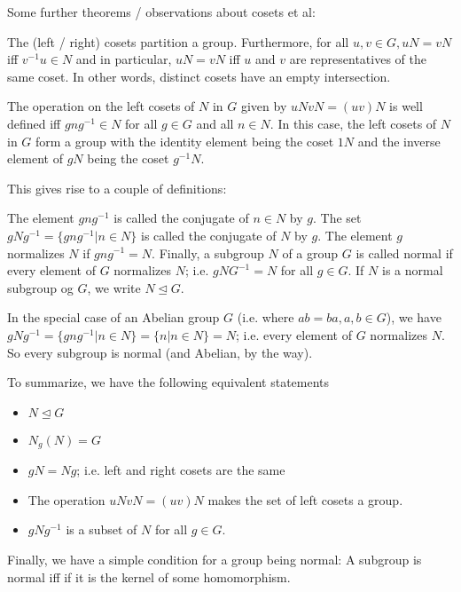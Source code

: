 
Some further theorems / observations about cosets et al:

The (left / right) cosets partition a group. Furthermore, for all $u,v \in G, uN = vN$ iff $v^{-1}u \in N$ and in particular, $uN = vN$ iff $u$ and $v$ are representatives of the same coset. In other words, distinct cosets have an empty intersection.

The operation on the left cosets of $N$ in $G$ given by $uN vN = (uv)N$ is well defined iff $gng^{-1} \in N$ for all $g \in G$ and all $n \in N$. In this case, the left cosets of $N$ in $G$ form a group with the identity element being the coset $1N$ and the inverse element of $gN$ being the coset $g^{-1}N$. 

This gives rise to a couple of definitions:

The element $gng^{-1}$ is called the conjugate of $n \in N$ by $g$. The set $gNg^{-1} = \{ gng^{-1} | n \in N\}$ is called the conjugate of $N$ by $g$. The element $g$ normalizes $N$ if $gng^{-1} = N$. Finally, a subgroup $N$ of a group $G$ is called normal if every element of $G$ normalizes $N$; i.e. $gNG^{-1} = N$ for all $g \in G$. If $N$ is a normal subgroup og $G$, we write $N \trianglelefteq G$.

In the special case of an Abelian group $G$ (i.e. where $ab = ba, a,b \in G$), we have $gNg^{-1} = \{gng^{-1} | n \in N \} = \{n |n \in N\} = N$; i.e. every element of $G$ normalizes $N$. So every subgroup is normal (and Abelian, by the way).

To summarize, we have the following equivalent statements

\begin{itemize}

\item $N \trianglelefteq G$

\item $N_g(N) = G$

\item $gN = Ng$; i.e. left and right cosets are the same

\item The operation $uN vN = (uv)N$ makes the set of left cosets a group.

\item $gNg^{-1}$ is a subset of $N$ for all $g \in G$.

\end{itemize}

Finally, we have a simple condition for a group being normal: A subgroup is normal iff if it is the kernel of some homomorphism.


